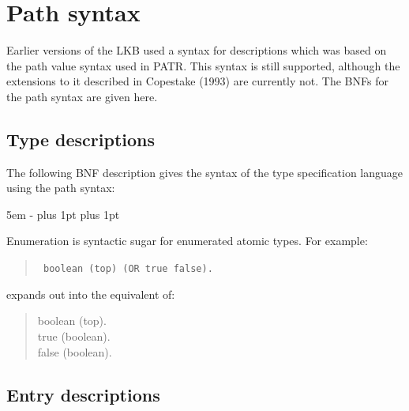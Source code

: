 \documentclass[12pt]{report}
\begin{document}
\chapter{Path syntax}
\label{pathbnf}

Earlier versions of the LKB used a syntax for descriptions
which was based on the path value syntax used in PATR.
This syntax is still supported, although the extensions to it
described in Copestake (1993) are currently not.
The BNFs for the path syntax are given here.

\section{Type descriptions}

The following BNF description gives the syntax of the type specification 
language using the path syntax:
\begin{list}{}
   {\leftmargin 5em
    \itemindent -\leftmargin
    \itemsep 0pt plus 1pt
    \parsep 0pt plus 1pt}
\end{list}
Enumeration is syntactic sugar for enumerated atomic types.  For example:
\begin{quote}
\tt
{\type boolean} ({\type top}) (OR {\type true} {\type false}).
\end{quote}
expands out into the equivalent of:
\begin{quote}
{\type boolean} ({\type top}).\\
{\type true} ({\type boolean}).\\
{\type false} ({\type boolean}).
\end{quote}

\section{Entry descriptions}
\end{document}
